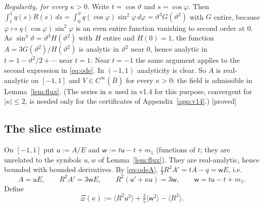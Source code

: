 \documentclass[11pt,a4paper]{article}
\theoremstyle{remark}
\theoremstyle{definition}
\theoremstyle{plain}
\theoremstyle{remark}
\newcommand{\st}[1]{\textsf{[#1]}}
\newcommand{\fu}{\mathsf{u}}%
\newcommand{\fw}{\mathsf{w}}
\begin{document}
\emph{Regularity, for every $\kappa>0$.} Write $t=\cos\vartheta$ and $s=\cos\varphi$. Then
$\int_t^1q(s)R(s)\,ds=\int_0^\vartheta q(\cos\varphi)\sin^2\!\varphi\,d\varphi=\vartheta^3G(\vartheta^2)$ with $G$ entire, because
$\varphi\mapsto q(\cos\varphi)\sin^2\!\varphi$ is an even entire function vanishing to second order at $0$. As
$\sin^3\vartheta=\vartheta^3H(\vartheta^2)$ with $H$ entire and $H(0)=1$, the function $A=3G(\vartheta^2)/H(\vartheta^2)$ is analytic in
$\vartheta^2$ near $0$, hence analytic in $t=1-\vartheta^2/2+\cdots$ near $t=1$. Near $t=-1$ the same argument applies to the second
expression in \eqref{eq:ode}. In $(-1,1)$ analyticity is clear. So $A$ is real-analytic on $[-1,1]$ and $V\in C^\infty(\bar B)$ for every $\kappa>0$:
the field is admissible in Lemma~\ref{lem:flux}. (The series in $\kappa$ used in v1.4 for this purpose, convergent for $|\kappa|\le2$, is
needed only for the certificates of Appendix~\ref{app:v14}.) \st{proved}

\subsection{The slice estimate}\label{sec:chslice}

On $[-1,1]$ put $\fu:=A/E$ and $\fw:=t\fu-t+m_1$ (functions of $t$; they are unrelated to the symbols $u,w$ of Lemma~\ref{lem:flux}). They are
real-analytic, hence bounded with bounded derivatives. By \eqref{eq:odeA}, $\frac13R^2A'=tA-q=\fw E$, i.e.
\begin{equation}\label{eq:ode3}
A=\fu E,\qquad R^2A'=3\fw E,\qquad R^2(\fu'+\kappa\fu)=3\fw,\qquad \fw=t\fu-t+m_1 .
\end{equation}
Define
\begin{equation}\label{eq:Xi}
\Xi(\kappa):=\langle R^2\fu^2\rangle+\tfrac35\langle\fw^2\rangle-\langle R^2\rangle .
\end{equation}
\end{document}
